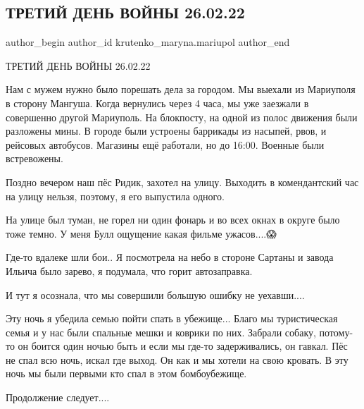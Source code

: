  
 
 
 
 

\subsection{ТРЕТИЙ ДЕНЬ ВОЙНЫ 26.02.22}
\label{sec:26_02_2023.fb.krutenko_maryna.mariupol.1.tretii_den_voini_26_}

\ifcmt
 author_begin
   author_id krutenko_maryna.mariupol
 author_end
\fi

ТРЕТИЙ ДЕНЬ ВОЙНЫ 26.02.22

Нам с мужем нужно было порешать дела за городом. Мы выехали из Мариуполя в
сторону Мангуша. Когда вернулись через 4 часа, мы уже заезжали в совершенно
другой Мариуполь. На блокпосту, на одной из полос движения были разложены мины.
В городе были устроены баррикады из насыпей, рвов, и рейсовых автобусов.
Магазины ещё работали, но до 16:00. Военные были встревожены.  

Поздно вечером наш пёс Ридик, захотел на улицу. Выходить в комендантский час на
улицу нельзя, поэтому, я его выпустила одного. 

На улице был туман, не горел ни один фонарь и во всех окнах в округе было тоже
темно.  У меня Булл ощущение какая фильме ужасов....😱

Где-то вдалеке шли бои.. Я посмотрела на небо в стороне Сартаны и завода Ильича
было зарево, я подумала, что горит автозаправка. 

И тут я осознала, что  мы совершили большую ошибку не уехавши.... 

Эту ночь я убедила семью пойти спать в убежище... Благо мы туристическая семья и
у нас были спальные мешки и коврики по них. Забрали собаку, потому-то он боится
один ночью быть и если мы где-то задерживались, он гавкал.  Пёс не спал всю
ночь, искал где выход. Он как и мы хотели на свою кровать. В эту ночь мы были
первыми кто спал в этом бомбоубежище. 

Продолжение следует....

